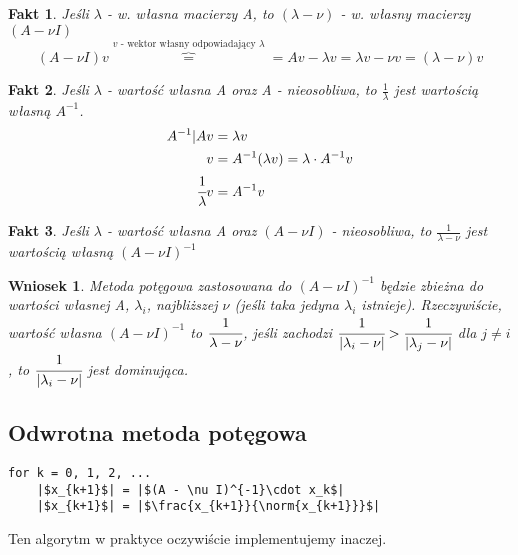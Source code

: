 \documentclass[hidelinks,a4paper,fleqn,oneside]{book}
\newcommand{\norm}[1]{\left\lVert#1\right\rVert}
\newtheorem{wniosek}{Wniosek}
\newtheorem{fakt}{Fakt}
\begin{document}

\begin{fakt}
	Jeśli $\lambda$ - w. własna macierzy A, to $(\lambda - \nu)$ - w. własny macierzy $(A - \nu I)$
	\[
		(A - \nu I)v \overbrace{=}^{v\textrm{ - wektor własny odpowiadający }\lambda} = Av - \lambda v = \lambda v - \nu v = (\lambda - \nu)v
	\]
\end{fakt} 

\begin{fakt} Jeśli $\lambda$ - wartość własna A oraz A - nieosobliwa, to $\frac{1}{\lambda}$ jest wartością własną $A^{-1}$.
	\begin{equation}
		\begin{aligned}
			A^{-1}| Av           & = \lambda v                                  \\
			v                    & = A^{-1}(\lambda v) = \lambda \cdot A^{-1} v \\
			\cfrac{1}{\lambda} v & = A^{-1}v                                    
		\end{aligned}
	\end{equation}
\end{fakt}

\begin{fakt} Jeśli $\lambda$ - wartość własna A oraz $(A - \nu I)$ - nieosobliwa, to $\frac{1}{\lambda - \nu}$ jest wartością własną $(A - \nu I)^{-1}$
\end{fakt}

\begin{wniosek} Metoda potęgowa zastosowana do $(A - \nu I)^{-1}$ będzie zbieżna do wartości własnej A, $\lambda_i$, najbliższej $\nu$ (jeśli taka jedyna $\lambda_i$ istnieje). Rzeczywiście, wartość własna $(A - \nu I)^{-1}$ to $\cfrac{1}{\lambda - \nu}$, jeśli zachodzi $\cfrac{1}{|\lambda_i - \nu|} > \cfrac{1}{|\lambda_j - \nu|}$ dla $j \neq i$, to $\cfrac{1}{|\lambda_i - \nu|}$ jest dominująca.
\end{wniosek}

\subsection{Odwrotna metoda potęgowa}
\begin{verbatim}
for k = 0, 1, 2, ...
    |$x_{k+1}$| = |$(A - \nu I)^{-1}\cdot x_k$|
    |$x_{k+1}$| = |$\frac{x_{k+1}}{\norm{x_{k+1}}}$|
\end{verbatim}
Ten algorytm w praktyce oczywiście implementujemy inaczej.
\end{document}
